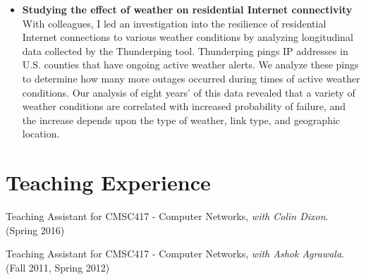 \begin{itemize}
\item{\bf{Studying the effect of weather on residential Internet connectivity}}
With colleagues, I led an investigation into the resilience of residential
  Internet connections to various weather conditions by analyzing
  longitudinal data
  collected by the Thunderping tool. Thunderping pings IP addresses in
  U.S. counties that have ongoing active weather alerts. We analyze these pings
  to determine how many more outages occurred during times of active
  weather conditions. Our analysis of eight years' of this data
  revealed that a variety
  of weather conditions are correlated with increased probability of
  failure, and the increase depends upon the type of weather, link
  type, and geographic location.


\end{itemize}


\section*{Teaching Experience}
\label{sec:teaching-experience}

\begin{itemize*}
\item Teaching Assistant for CMSC417 - Computer Networks, \emph{with
    Colin Dixon}. \hfill (Spring 2016)
\item Teaching Assistant for CMSC417 - Computer Networks, \emph{with
    Ashok Agrawala}. \hfill (Fall 2011, Spring 2012)
\end{itemize*}




















